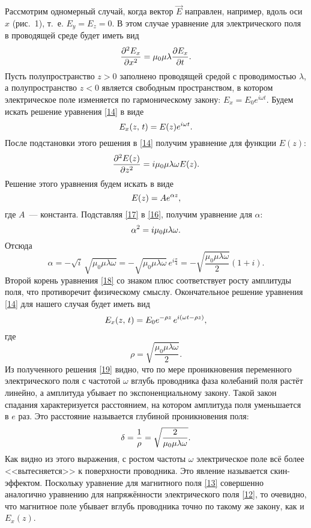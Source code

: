 Рассмотрим одномерный случай, когда вектор $\vec{E}$ направлен, например, вдоль оси $x$ (рис.~1), т.~е. $E_y=E_z=0$. В этом
случае уравнение для электрического поля в проводящей среде будет иметь вид
\begin{equation} \eqmark{14}
\frac{\partial^2E_x}{\partial x^2}=\mu_0\mu\lambda\ddt{E_x}.
\end{equation}
Пусть полупространство $z>0$ заполнено проводящей средой с проводимостью $\lambda$, а полупространство $z<0$ является
свободным пространством, в котором электрическое поле изменяется по гармоническому закону: $E_x=E_0e^{i\omega t}$. Будем
искать решение уравнения \eqref{14} в виде
\begin{equation} \eqmark{15}
E_x(z,\,t)=E(z)e^{i\omega t}.
\end{equation}
После подстановки этого решения в \eqref{14} получим уравнение для функции $E(z)$:
\begin{equation} \eqmark{16}
\frac{\partial^2E(z)}{\partial z^2}=i\mu_0\mu\lambda\omega E(z).
\end{equation}
Решение этого уравнения будем искать в виде
\begin{equation} \eqmark{17}
E(z)=Ae^{\alpha z},
\end{equation}
где $A$~--- константа. Подставляя \eqref{17} в \eqref{16}, получим уравнение для $\alpha$:
\begin{equation} \eqmark{18}
\alpha^2=i\mu_0\mu\lambda\omega.
\end{equation}
Отсюда
\[
\alpha=-\sqrt{i}\,\sqrt{\mu_0\mu\lambda\omega}=-\sqrt{\mu_0\mu\lambda\omega}\,e^{i\frac{\pi}{4}}=-\sqrt{\frac{\mu_0\mu\lambda\omega}{2}}(1+i).
\]
Второй корень уравнения \eqref{18} со знаком плюс соответствует росту амплитуды поля, что противоречит физическому смыслу.
Окончательное решение уравнения \eqref{14} для нашего случая будет иметь вид
\begin{equation} \eqmark{19}
E_x(z,\,t)=E_0e^{-\rho z}\,e^{i(\omega t-\rho z)},
\end{equation}
где
\[
\rho=\sqrt{\frac{\mu_0\mu\lambda\omega}{2}}.
\]
Из полученного решения \eqref{19} видно, что по мере проникновения переменного электрического поля с частотой $\omega$ вглубь
проводника фаза колебаний поля растёт линейно, а амплитуда убывает по экспоненциальному закону. Такой закон спадания
характеризуется расстоянием, на котором амплитуда поля уменьшается в $e$ раз. Это расстояние называется глубиной
проникновения поля:
\begin{equation} \eqmark{20}
\delta=\frac{1}{\rho}=\sqrt{\frac{2}{\mu_0\mu\lambda\omega}}.
\end{equation}
Как видно из этого выражения, с ростом частоты $\omega$ электрическое поле всё более <<вытесняется>> к поверхности
проводника. Это явление называется скин-эффектом. Поскольку уравнение для магнитного поля \eqref{13} совершенно аналогично
уравнению для напряжённости электрического поля \eqref{12}, то очевидно, что магнитное поле убывает вглубь проводника
точно по такому же закону, как и $E_x(z)$.

